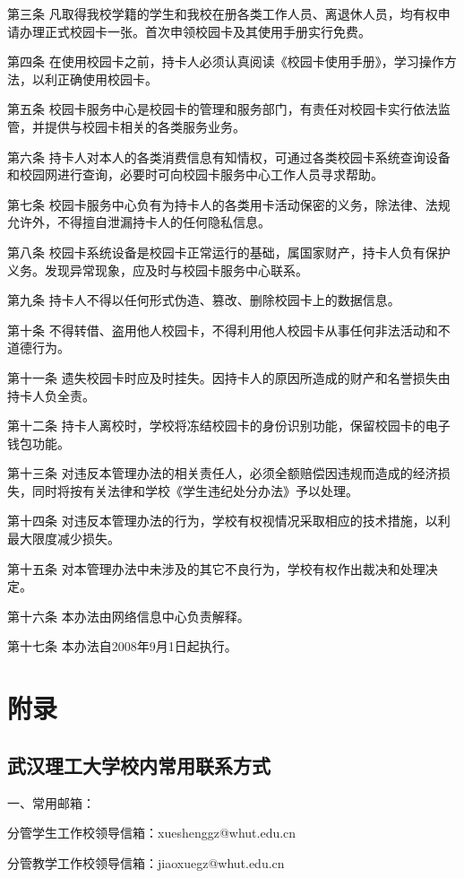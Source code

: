 \documentclass[UTF8,12pt,a4paper]{report}
\begin{document}
第三条 凡取得我校学籍的学生和我校在册各类工作人员、离退休人员，均有权申请办理正式校园卡一张。首次申领校园卡及其使用手册实行免费。

第四条 在使用校园卡之前，持卡人必须认真阅读《校园卡使用手册》，学习操作方法，以利正确使用校园卡。

第五条 校园卡服务中心是校园卡的管理和服务部门，有责任对校园卡实行依法监管，并提供与校园卡相关的各类服务业务。

第六条 持卡人对本人的各类消费信息有知情权，可通过各类校园卡系统查询设备和校园网进行查询，必要时可向校园卡服务中心工作人员寻求帮助。

第七条 校园卡服务中心负有为持卡人的各类用卡活动保密的义务，除法律、法规允许外，不得擅自泄漏持卡人的任何隐私信息。

第八条 校园卡系统设备是校园卡正常运行的基础，属国家财产，持卡人负有保护义务。发现异常现象，应及时与校园卡服务中心联系。

第九条 持卡人不得以任何形式伪造、篡改、删除校园卡上的数据信息。

第十条 不得转借、盗用他人校园卡，不得利用他人校园卡从事任何非法活动和不道德行为。

第十一条 遗失校园卡时应及时挂失。因持卡人的原因所造成的财产和名誉损失由持卡人负全责。

第十二条 持卡人离校时，学校将冻结校园卡的身份识别功能，保留校园卡的电子钱包功能。

第十三条 对违反本管理办法的相关责任人，必须全额赔偿因违规而造成的经济损失，同时将按有关法律和学校《学生违纪处分办法》予以处理。

第十四条 对违反本管理办法的行为，学校有权视情况采取相应的技术措施，以利最大限度减少损失。

第十五条 对本管理办法中未涉及的其它不良行为，学校有权作出裁决和处理决定。

第十六条 本办法由网络信息中心负责解释。

第十七条 本办法自2008年9月1日起执行。

\part{附录}
\chapter{武汉理工大学校内常用联系方式}
一、常用邮箱：

分管学生工作校领导信箱：xueshenggz@whut.edu.cn

分管教学工作校领导信箱：jiaoxuegz@whut.edu.cn
\end{document}
